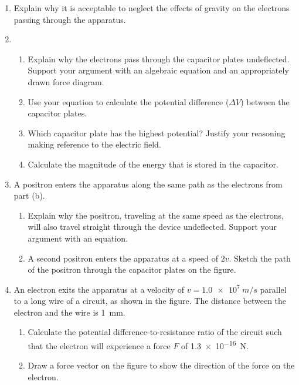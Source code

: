 \documentclass{../../oss-apphys}
\begin{document}
\begin{enumerate}[leftmargin=15pt]
  \begin{enumerate}[noitemsep]
  \item\vspace{-.2in} Explain why it is acceptable to neglect the effects of
    gravity on the electrons passing through the apparatus.
  \item
    \begin{enumerate}
    \item Explain why the electrons pass through the capacitor plates
      undeflected. Support your argument with an algebraic equation
      and an appropriately drawn force diagram.

    \item Use your equation to calculate the potential difference ($\Delta V$)
      between the capacitor plates.

    \item Which capacitor plate has the highest potential? Justify your 
      reasoning making reference to the electric field.

    \item Calculate the magnitude of the energy that is stored in the capacitor.
    \end{enumerate}

  \item A positron enters the apparatus along the same path as the
    electrons from part (b).
    \begin{enumerate}
    \item Explain why the positron, traveling at the same speed as the
      electrons, will also travel straight through the device undeflected.
      Support your argument with an equation.
    \item A second positron enters the apparatus at a speed of $2v$. Sketch
      the path of the positron through the capacitor plates on the figure.
    \end{enumerate}

  \item An electron exits the apparatus at a velocity of $v=\SI{1.0e7}{m/s}$
    parallel to a long wire of a circuit, as shown in the figure. The
    distance between the electron and the wire is \SI{1}{mm}.
    \begin{center}
    \end{center}
    \begin{enumerate}
    \item Calculate the potential difference-to-resistance ratio of the circuit
      such that the electron will experience a force $F$ of \SI{1.3e-16}{N}.
    \item Draw a force vector on the figure to show the direction of the force
      on the electron.
    \end{enumerate}
  \end{enumerate}
\end{enumerate}
\end{document}

